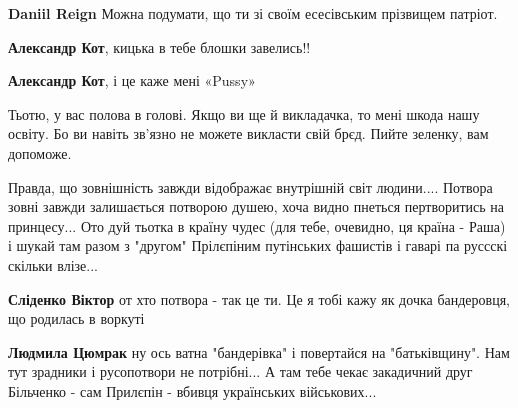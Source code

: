 \begin{itemize}
\begin{itemize}

\textbf{Daniil Reign} Можна подумати, що ти зі своїм есесівським прізвищем патріот.


\textbf{Александр Кот}, кицька в тебе блошки завелись!!


\textbf{Александр Кот}, і це каже мені «Pussy»

\end{itemize}



Тьотю, у вас полова в голові. Якщо ви ще й викладачка, то мені шкода нашу
освіту. Бо ви навіть зв'язно не можете викласти свій брєд. Пийте зеленку, вам
допоможе.





Правда, що зовнішність завжди відображає внутрішній світ людини.... Потвора
зовні завжди залишається потворою душею, хоча видно пнеться пертворитись на
принцесу... Ото дуй тьотка в країну чудес (для тебе, очевидно, ця країна -
Раша) і шукай там разом з "другом" Прілєпіним путінських фашистів і гаварі па
руссскі скільки влізе...


\begin{itemize}

\textbf{Сліденко Віктор} от хто потвора - так це ти. Це я тобі кажу як дочка бандеровця, що родилась в воркуті


\textbf{Людмила Цюмрак} ну ось ватна "бандерівка" і повертайся на "батьківщину". Нам тут зрадники і русопотвори не потрібні... А там тебе чекає закадичний друг Більченко - сам Прилєпін - вбивця українських військових...


\end{itemize}
\end{itemize}
